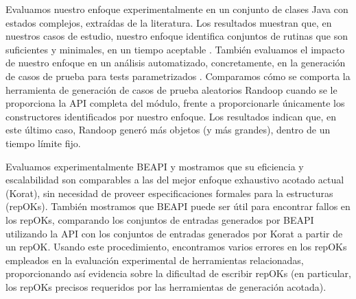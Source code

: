 Evaluamos nuestro enfoque experimentalmente en un conjunto de clases Java con estados complejos, extraídas de la literatura. Los resultados muestran que, en nuestros casos de estudio, nuestro enfoque identifica conjuntos de rutinas que son suficientes y minimales, en un tiempo aceptable . También evaluamos el impacto de nuestro enfoque en un análisis automatizado, concretamente, en la generación de casos de prueba para tests parametrizados . Comparamos cómo se comporta la herramienta de generación de casos de prueba aleatorios Randoop cuando se le proporciona la API completa del módulo, frente a proporcionarle únicamente los constructores identificados por nuestro enfoque. Los resultados indican que, en este último caso, Randoop generó más objetos (y más grandes), dentro de un tiempo límite fijo.


Evaluamos experimentalmente BEAPI y mostramos que su eficiencia y escalabilidad son comparables a las del mejor enfoque exhaustivo acotado actual (Korat), sin necesidad de proveer especificaciones formales para la estructuras (repOKs). También mostramos que BEAPI puede ser útil para encontrar fallos en los repOKs, comparando los conjuntos de entradas generados por BEAPI utilizando la API con los conjuntos de entradas generados por Korat a partir de un repOK. Usando este procedimiento, encontramos varios errores en los repOKs empleados en la evaluación experimental de herramientas relacionadas, proporcionando así evidencia sobre la dificultad de escribir repOKs (en particular, los repOKs precisos requeridos por las herramientas de generación acotada).









